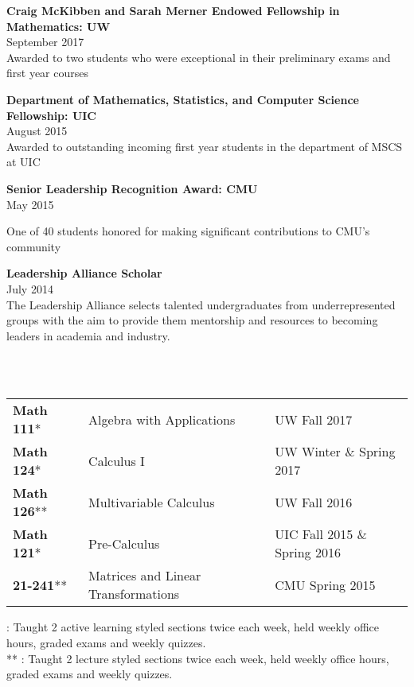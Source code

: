 \documentclass[12 pt]{article}
\newcommand{\lineunder}{\vspace*{-8pt} \\ \hspace*{-18pt} \hrulefill \\}
\newcommand{\header}[1]{{\hspace*{-15pt}\vspace*{6pt} \selectfont{\textsc{#1}}} \vspace*{-6pt} \lineunder}
\begin{document}
\textbf{Craig McKibben and Sarah Merner Endowed Fellowship in Mathematics:  UW}\\
September 2017\\
\smallskip
Awarded to two students who were exceptional in their preliminary exams 
and first year courses\\
\bigskip

\textbf{Department of Mathematics, Statistics, and Computer Science Fellowship: UIC}\\
August 2015\\
\smallskip
Awarded to outstanding incoming first year students in the department of MSCS at UIC\\
\bigskip


\textbf{Senior Leadership Recognition Award: CMU }\\

May 2015\\
\smallskip

One of 40 students honored for making significant contributions to CMU's community 
\bigskip

\textbf{Leadership Alliance Scholar}\\
July 2014\\
\smallskip
The Leadership Alliance selects talented undergraduates from underrepresented groups with the aim to
provide them mentorship and resources to becoming leaders in academia and industry. 
\bigskip


\clearpage
\header{Teaching}

\begin{center}
	\begin{tabular}{ l l l }
	  \textbf{Math 111}*& Algebra with Applications & UW Fall 2017 \\ 
	  \textbf{Math 124}*&	 Calculus I & UW Winter  \& Spring 2017  \\  
	 \textbf{Math 126}** &    Multivariable Calculus   & UW Fall 2016    \\
	\textbf{Math 121}*	& Pre-Calculus	& UIC Fall 2015 \& Spring 2016\\	
	\textbf{21-241}**	&	Matrices and Linear Transformations & CMU Spring 2015 	
	\end{tabular}
\end{center}
\smallskip
{\scriptsize * : Taught 2 active learning styled sections twice each week,
 held weekly office hours, graded exams and weekly quizzes. \\
** : Taught 2 lecture styled sections twice each week, held weekly office hours, graded exams and weekly quizzes.} \\
\end{document}
